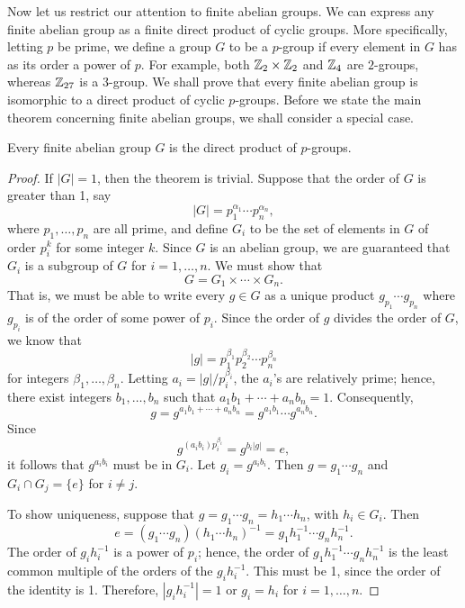 \medskip
 
Now let us restrict our attention to finite abelian groups. We can
express any finite abelian group as a finite direct product of cyclic
groups. More specifically, letting $p$ be prime, we define a group $G$
to be a {\bfi $p$-group\/} if every element in 
$G$ has as its order a power of $p$. For example, both ${\Bbb Z}_2 
\times {\Bbb Z}_2$ and ${\Bbb Z}_4$ are $2$-groups, whereas 
${\Bbb Z}_{27}$ is a $3$-group. We shall prove that every finite 
abelian group is isomorphic to a direct product of cyclic $p$-groups. 
Before we  state the main theorem concerning finite abelian groups, we 
shall consider a special case.
 
 
\begin{theorem}
Every finite abelian group $G$ is the direct product of $p$-groups. 
\end{theorem}
 
 
\begin{proof}
If $|G|= 1$, then the theorem is trivial.  Suppose that the order of
$G$ is greater than 1, say 
\[
|G| = p_1^{\alpha_1} \cdots p_n^{\alpha_n},
\]
where $p_1, \ldots, p_n$ are all prime, and define $G_i$ to be the set
of elements in $G$ of order $p_i^k$ for some integer $k$. Since $G$ is
an abelian group, we are guaranteed that $G_i$ is a subgroup of $G$
for $i = 1, \ldots, n$. We must show that
\[
G = G_1 \times \cdots \times G_n.
\]
That is, we must be able to write every $g \in G$ as a unique product
$g_{p_1} \cdots g_{p_n}$ where $g_{p_i}$ is of the order of some power
of $p_i$. Since the order of $g$ divides the order of $G$, we know
that 
\[
|g| = p_1^{\beta_1}  p_2^{\beta_2} \cdots p_n^{\beta_n}
\]
for integers $\beta_1, \ldots, \beta_n$. Letting $a_i = |g| /
p_i^{\beta_i}$, the $a_i$'s are relatively prime; hence, there exist
integers $b_1, \ldots, b_n$ such that $a_1 b_1 + \cdots + a_n b_n =
1$. Consequently, 
\[
g = g^{a_1 b_1 + \cdots + a_n b_n} = g^{a_1 b_1} \cdots  g^{a_n b_n}. 
\]
Since
\[
g^{(a_i b_i ) p_i^{\beta_i}} = g^{b_i |g|} = e,
\]
it follows that $g^{a_i b_i}$ must be in $G_{i}$. Let $g_i =
g^{a_i b_i}$. Then $g = g_1 \cdots g_n$ and $G_i \cap G_j = \{ e \}$ for $i
\neq j$. 
 
 
To show uniqueness, suppose that $g = g_1 \cdots g_n = h_1 \cdots h_n$,
with $h_i \in G_i$. Then
\[
e = (g_1 \cdots g_n)(h_1 \cdots h_n)^{-1} = g_1 h_1^{-1} \cdots g_n
h_n^{-1}. 
\]
The order of $g_i h_i^{-1}$ is a power of $p_i$; hence, the order of
$g_1 h_1^{-1} \cdots g_n h_n^{-1}$ is the least common multiple of the
orders of the $g_i h_i^{-1}$.  This must be 1, since the order of the
identity is 1. Therefore, $|g_i h_i^{-1}| =1$ or $g_i =h_i$ for $i =
1, \ldots, n$.
\mbox{\hspace{1in}}
\end{proof}
 
